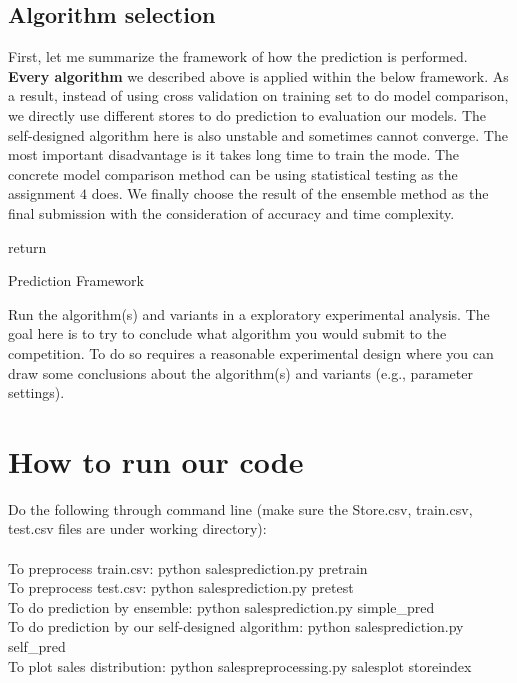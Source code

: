 \documentclass[11pt]{article}
\begin{document}
\subsection{Algorithm selection}

First, let me summarize the framework of how the prediction is performed. \textbf{Every algorithm} we described above is applied within the below framework. As a result, instead of using cross validation on training set to do model comparison, we directly use different stores to do prediction to evaluation our models. The self-designed algorithm here is also unstable and sometimes cannot converge. The most important disadvantage is it takes long time to train the mode. The concrete model comparison method can be using statistical testing as the assignment $4$ does. We finally choose the result of the ensemble method as the final submission with the consideration of accuracy and time complexity.  

\begin{algorithm}[H]
	return\;
\caption{Prediction Framework}
\end{algorithm}

Run the algorithm(s) and variants in a exploratory experimental analysis.
The goal here is to try to conclude what algorithm you would submit
to the competition. To do so requires a reasonable experimental design where you can
draw some conclusions about the algorithm(s) and variants (e.g., parameter settings).

\section{How to run our code}
Do the following through command line (make sure the Store.csv, train.csv, test.csv files are under working directory): \\
\\
To preprocess train.csv: python salesprediction.py pretrain \\
To preprocess test.csv: python salesprediction.py pretest \\
To do prediction by ensemble: python salesprediction.py simple\_pred \\
To do prediction by our self-designed algorithm: python salesprediction.py self\_pred \\
To plot sales distribution: python salespreprocessing.py salesplot storeindex \\
\end{document}
